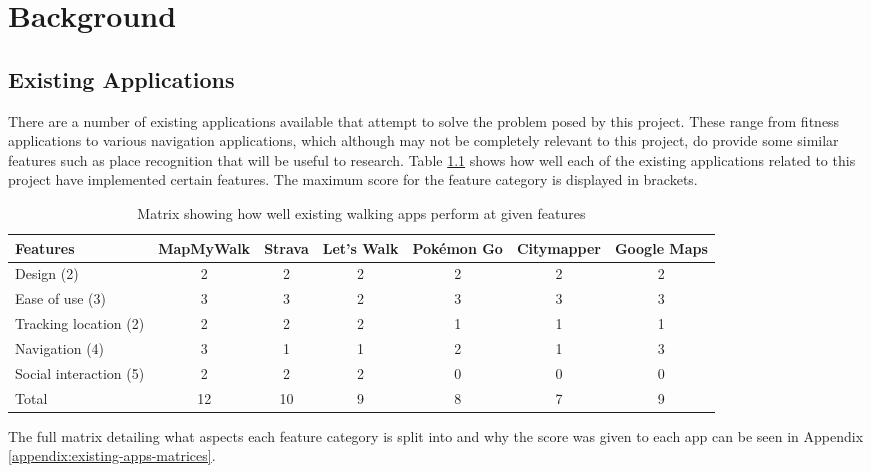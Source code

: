 \chapter{Background}


\section{Existing Applications}


There are a number of existing applications available that attempt to solve the problem posed by this project. These range from fitness applications to various navigation applications, which although may not be completely relevant to this project, do provide some similar features such as place recognition that will be useful to research. Table \ref{table:existing-walking-apps} shows how well each of the existing applications related to this project have implemented certain features. The maximum score for the feature category is displayed in brackets.

\begin{table}[htb]
  \centering
  \begin{tabular}{|m{2cm}||c|c|c|c|c|c|}
    \hline
    Features & MapMyWalk & Strava & Let's Walk & Pok\'{e}mon Go & Citymapper & Google Maps\\
    \hline
    \hline
    Design (2) & 2 & 2 & 2 & 2 & 2 & 2\\
    \hline
    Ease of use (3) & 3 & 3 & 2 & 3 & 3 & 3\\
    \hline
    Tracking location (2) & 2 & 2 & 2 & 1 & 1 & 1\\
    \hline
    Navigation (4) & 3 & 1 & 1 & 2 & 1 & 3\\
    \hline
    Social interaction (5) & 2 & 2 & 2 & 0 & 0 & 0\\
    \hline
    \hline
    Total & 12 & 10 & 9 & 8 & 7 & 9\\
    \hline
  \end{tabular}
  \caption{Matrix showing how well existing walking apps perform at given features}
  \label{table:existing-walking-apps}
\end{table}

The full matrix detailing what aspects each feature category is split into and why the score was given to each app can be seen in Appendix \ref{appendix:existing-apps-matrices}.


